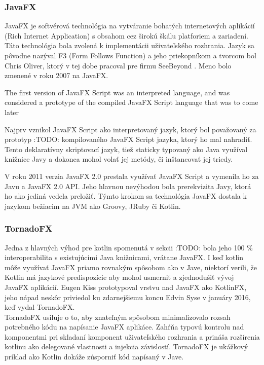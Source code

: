 \subsubsection{JavaFX}
 JavaFX je softvérová technológia na vytváranie bohatých internetových aplikácií (Rich Internet Application) s obsahom cez širokú škálu platforiem a zariadení.
Táto technológia bola zvolená k implementácii uživateľského rozhrania. Jazyk sa pôvodne nazýval F3 (Form Follows Function) a jeho priekopníkom a tvorcom bol Chris Oliver, ktorý v tej dobe pracoval pre firmu SeeBeyond \cite{dea2011javafx}. Meno bolo zmenené v roku 2007 na JavaFX. \cite{anderson2009essential}

The first version of JavaFX Script was an interpreted language, and was considered a prototype of the compiled JavaFX Script language that was to come later

Najprv vznikol JavaFX Script ako interpretovaný jazyk, ktorý bol považovaný za prototyp :TODO: kompilovaného JavaFX Script jazyka, ktorý ho mal nahradiť. Tento deklaratívny skriptovací jazyk, tiež staticky typovaný ako Java využíval knižnice Javy a dokonca mohol volať jej metódy, či inštancovať jej triedy. \cite{weaver2007javafx}

V roku 2011 verzia JavaFX 2.0 prestala využívať JavaFX Script a vymenila ho za Javu a JavaFX 2.0 API. \cite{dea2011javafx}Jeho hlavnou nevýhodou bola prerekvizita Javy, ktorá ho ako jediná vedela preložiť. Týmto krokom sa technológia JavaFX dostala k jazykom bežiacim na JVM ako Groovy, JRuby či Kotlin.

\subsubsection{TornadoFX}

Jedna z hlavných výhod pre kotlin spomenutá v sekcii :TODO: bola
jeho 100 \% interoperabilita s existujúcimi Java knižnicami, vrátane JavaFX. I keď kotlin môže využívať JavaFX priamo rovnakým spôsobom ako v Jave, niektorí verili, že Kotlin má jazykové predispozície aby mohol usmerniť a zjednodušiť vývoj JavaFX aplikácií. Eugen Kiss prototypoval vrstvu nad JavaFX ako KotlinFX, jeho nápad neskôr priviedol ku zdarnejšiemu koncu Edvin Syse v januáry 2016\cite{tornadofx}, keď vydal TornadoFX.
\\
TornadoFX usiluje o to, aby znateľným spôsobom minimalizovalo rozsah potrebného kódu na napísanie JavaFX aplikáce. Zahŕňa typovú kontrolu nad komponentmi pri skladaní komponent uživateľského rozhrania a prináša rozšírenia kotlinu ako delegované vlastnosti a injekcia závislostí. TornadoFX je ukážkový príklad ako Kotlin dokáže zúsporniť kód napísaný v Jave.

